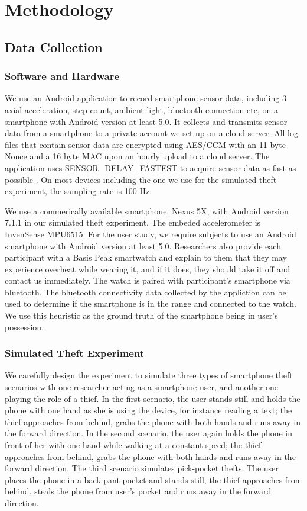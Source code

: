 \documentclass{soups}
\begin{document}
\section{Methodology}

\subsection{Data Collection}

\subsubsection{Software and Hardware}
We use an Android application to record smartphone sensor data, including 3 axial acceleration, step count, ambient light, bluetooth connection etc, on a smartphone with Android version at least 5.0. It collects and transmits sensor data from a smartphone to a private account we set up on a cloud server. All log files that contain sensor data are encrypted using AES/CCM with an 11 byte Nonce and a 16 byte MAC upon an hourly upload to a cloud server. The application uses SENSOR\_DELAY\_FASTEST to acquire sensor data as fast as possible \cite{android:doc}. On most devices including the one we use for the simulated theft experiment, the sampling rate is 100 Hz. 

We use a commerically available smartphone, Nexus 5X, with Android version 7.1.1 in our simulated theft experiment. The embeded accelerometer is InvenSense MPU6515. For the user study, we require subjects to use an Android smartphone with Android version at least 5.0. Researchers also provide each participant with a Basis Peak smartwatch and explain to them that they may experience overheat while wearing it, and if it does, they should take it off and contact us immediately. The watch is paired with participant's smartphone via bluetooth. The bluetooth connectivity data collected by the appliction can be used to determine if the smartphone is in the range and connected to the watch. We use this heuristic as the ground truth of the smartphone being in user's possession.

\subsubsection{Simulated Theft Experiment}
We carefully design the experiment to simulate three types of smartphone theft scenarios with one researcher acting as a smartphone user, and another one playing the role of a thief. In the first scenario, the user stands still and holds the phone with one hand as she is using the device, for instance reading a text; the thief approaches from behind, grabs the phone with both hands and runs away in the forward direction. In the second scenario, the user again holds the phone in front of her with one hand while walking at a constant speed; the thief approaches from behind, grabs the phone with both hands and runs away in the forward direction. The third scenario simulates pick-pocket thefts. The user places the phone in a back pant pocket and stands still; the thief approaches from behind, steals the phone from user's pocket and runs away in the forward direction.
\end{document}
